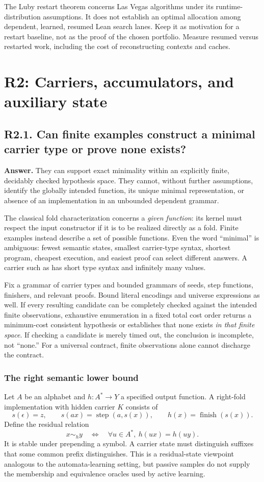\documentclass[11pt,a4paper]{article}
\newcommand{\code}[1]{\texttt{\detokenize{#1}}}
\newcommand{\question}[2]{\subsection{#1. #2}\label{q:#1}}
\newcommand{\finish}{\operatorname{finish}}
\newcommand{\step}{\operatorname{step}}
\theoremstyle{definition}
\theoremstyle{remark}
\begin{document}
The Luby restart theorem concerns Las Vegas algorithms under its runtime-distribution assumptions.\cite{luby} It does not establish an optimal allocation among dependent, learned, resumed Lean search lanes. Keep it as motivation for a restart baseline, not as the proof of the chosen portfolio. Measure resumed versus restarted work, including the cost of reconstructing contexts and caches.

\section{R2: Carriers, accumulators, and auxiliary state}\label{sec:r2}

\question{R2.1}{Can finite examples construct a minimal carrier type or prove none exists?}

\textbf{Answer.} They can support exact minimality within an explicitly finite, decidably checked hypothesis space. They cannot, without further assumptions, identify the globally intended function, its unique minimal representation, or absence of an implementation in an unbounded dependent grammar.

The classical fold characterization concerns a \emph{given function}: its kernel must respect the input constructor if it is to be realized directly as a fold.\cite{folds} Finite examples instead describe a set of possible functions. Even the word ``minimal'' is ambiguous: fewest semantic states, smallest carrier-type syntax, shortest program, cheapest execution, and easiest proof can select different answers. A carrier such as \code{Nat} has short type syntax and infinitely many values.

Fix a grammar of carrier types and bounded grammars of seeds, step functions, finishers, and relevant proofs. Bound literal encodings and universe expressions as well. If every resulting candidate can be completely checked against the intended finite observations, exhaustive enumeration in a fixed total cost order returns a minimum-cost consistent hypothesis or establishes that none exists \emph{in that finite space}. If checking a candidate is merely timed out, the conclusion is incomplete, not ``none.'' For a universal contract, finite observations alone cannot discharge the contract.

\subsubsection*{The right semantic lower bound}

Let $A$ be an alphabet and $h:A^*\to Y$ a specified output function. A right-fold implementation with hidden carrier $K$ consists of
\[
 s(\epsilon)=z,\qquad s(ax)=\step(a,s(x)),\qquad h(x)=\finish(s(x)).
\]
Define the residual relation
\[
 x\sim_h y\quad\Longleftrightarrow\quad
       \forall u\in A^*,\ h(ux)=h(uy).
\]
It is stable under prepending a symbol. A carrier state must distinguish suffixes that some common prefix distinguishes. This is a residual-state viewpoint analogous to the automata-learning setting, but passive samples do not supply the membership and equivalence oracles used by active learning.\cite{angluin}
\end{document}
